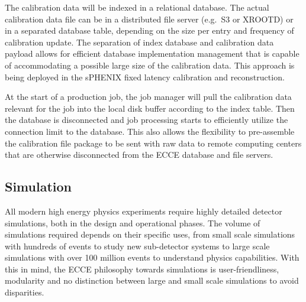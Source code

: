 The calibration data will be indexed in a relational database. The actual calibration data file can be in a distributed file server (e.g.\ S3 or XROOTD) or in a separated database table, depending on the size per entry and frequency of calibration update. The separation of index database and calibration data payload allows for efficient database implementation management that is capable of accommodating a possible large size of the calibration data. This approach is being deployed in the sPHENIX fixed latency calibration and reconstruction.

At the start of a production job, the job manager will pull the calibration data relevant for the job into the local disk buffer according to the index table. Then the database is disconnected and job processing starts to efficiently utilize the connection limit to the database. This also allows the flexibility to pre-assemble the calibration file package to be sent with raw data to remote computing centers that are otherwise disconnected from the ECCE database and file servers. 





\subsection{Simulation}






	All modern high energy physics experiments require highly detailed detector simulations, both in the design and operational phases. The volume of simulations required depends on their specific uses, from small scale simulations with hundreds of events to study new sub-detector systems to large scale simulations with over 100 million events to understand physics capabilities. With this in mind, the ECCE philosophy towards simulations is user-friendliness, modularity and no distinction between large and small scale simulations to avoid disparities. 
	
